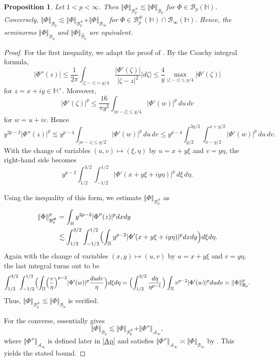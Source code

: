 \documentclass[amstex,12pt,reqno]{amsart}
\newtheorem{proposition}[theorem]{Proposition}
\theoremstyle{definition}
\begin{document}
\begin{proposition}\label{new}
Let $1<p<\infty$. Then $\Vert \Phi \Vert_{{\mathcal B}_p^{\#}} \lesssim \Vert \Phi \Vert_{{\mathcal B}_p}$
for $\Phi \in {\mathcal B}_p(\mathbb H)$. 
Conversely, 
$\Vert \Phi \Vert_{{\mathcal B}_p} \lesssim \Vert \Phi \Vert_{{\mathcal B}_p^{\#}}+\Vert \Phi \Vert_{{\mathcal B}_\infty}$ for
$\Phi \in {\mathcal B}_p^{\#}(\mathbb H) \cap {\mathcal B}_\infty(\mathbb H)$.
Hence, the seminorms $\Vert \Phi \Vert_{{\mathcal B}_p}$ and $\Vert \Phi \Vert_{\widehat{\mathcal B}_p}$ are equivalent.
\end{proposition}

\begin{proof}
For the first inequality, we adapt the proof of \cite[Lemma~3.3]{STW}.
By the Cauchy integral formula,
$$
|\Phi''(z)| \leq \frac{1}{2\pi}\int_{|\zeta-z|=y/4} \frac{|\Phi'(\zeta)|}{|\zeta-z|^2}|d\zeta|
\leq \frac{4}{y} \max_{|\zeta-z|\leq y/4} |\Phi'(\zeta)|
$$
for $z=x+iy \in \mathbb H^+$. 
Moreover,
$$
|\Phi'(\zeta)|^p \leq 
\frac{16}{\pi y^2} \int_{|w-\zeta| \leq y/4}|\Phi'(w)|^p\,du\,dv
$$
for $w=u+iv$. Hence
$$
y^{2p-2}|\Phi''(z)|^p \lesssim y^{p-4} \int_{|w-z|\leq y/2} |\Phi'(w)|^p\,du\,dv
\leq y^{p-4} \int_{y/2}^{3y/2} \int_{x-y/2}^{x+y/2} |\Phi'(w)|^p\,du\,dv.
$$
With the change of variables $(u,v) \mapsto (\xi,\eta)$ by $u=x+y\xi$ and $v=y\eta$,
the right-hand side becomes
$$
y^{p-2} \int_{1/2}^{3/2} \int_{-1/2}^{1/2} |\Phi'(x+y\xi+iy \eta)|^p \,d\xi\,d\eta.
$$

Using the inequality of this form, we estimate $\Vert \Phi \Vert_{{\mathcal B}_p^{\#}}$ as
\begin{align*}
\Vert \Phi \Vert_{{\mathcal B}_p^{\#}}^p&=\int_{\mathbb H} y^{2p-2}|\Phi''(z)|^pdxdy\\
&\lesssim  \int_{1/2}^{3/2} \int_{-1/2}^{1/2} \Bigl(\int_{\mathbb H} y^{p-2}|\Phi'(x+y\xi+iy \eta)|^p dxdy \Bigr) d\xi d\eta. 
\end{align*}
Again with the change of variables $(x,y) \mapsto (u,v)$ by $u=x+y\xi$ and $v=y \eta$, the last integral turns out to be
$$
\int_{1/2}^{3/2} \int_{-1/2}^{1/2} \Bigl(\int_{\mathbb H} \Bigl(\frac{v}{\eta} \Bigr)^{p-2}|\Phi'(w)|^p \frac{dudv}{\eta} \Bigr) d\xi d\eta
=\Bigl(\int_{1/2}^{3/2} \frac{d\eta}{\eta^{p-1}}\Bigr)\int_{\mathbb H} v^{p-2}|\Phi'(w)|^p dudv
\asymp \Vert \Phi \Vert_{{\mathcal B}_p}^p.
$$
Thus, $\Vert \Phi \Vert_{{\mathcal B}_p^{\#}} \lesssim \Vert \Phi \Vert_{{\mathcal B}_p}$ is verified.

For the converse, \cite[Lemma~3.2]{LS} essentially gives
$$
\Vert \Phi \Vert_{{\mathcal B}_p} \lesssim \Vert \Phi \Vert_{{\mathcal B}_p^{\#}}+
\Vert \Phi'' \Vert_{{\mathcal A}_\infty},
$$
where $\Vert \Phi'' \Vert_{{\mathcal A}_\infty}$ is defined later in \eqref{Ap} and satisfies
$\Vert \Phi'' \Vert_{{\mathcal A}_\infty} \asymp \Vert \Phi \Vert_{{\mathcal B}_\infty}$ by
\cite[Lemma~6.3]{ShenV}. This yields the stated bound.
\end{proof}
\end{document}
